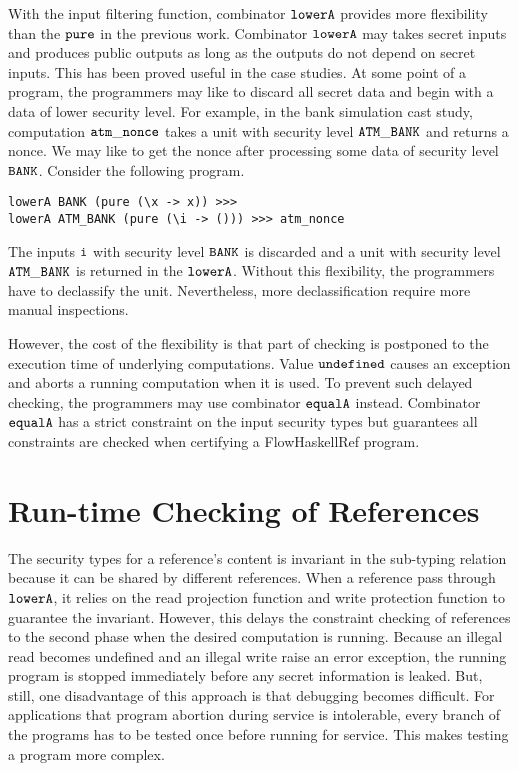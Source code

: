 \documentclass{report}
\newcommand{\co}[1]{$\cod{#1}$}
\begin{document}
With the input filtering function, combinator \co{lowerA} provides more flexibility than
the \co{pure} in the previous work. Combinator \co{lowerA} may takes secret inputs and produces
public outputs as long as the outputs do not depend on secret inputs. This has been proved
useful in the case studies. At some point of a program, the programmers may like to discard all
secret data and begin with a data of lower security level. 
For example, in the bank simulation cast study, computation
\co{atm\_nonce} takes a unit with security level \co{ATM\_BANK} and returns a nonce. 
We may like to get the nonce after processing some data of security level \co{BANK}.
Consider the following program.
\begin{Verbatim}[fontsize=\small]
lowerA BANK (pure (\x -> x)) >>>
lowerA ATM_BANK (pure (\i -> ())) >>> atm_nonce
\end{Verbatim}
The inputs \co{i} with security level \co{BANK} is discarded and a unit with security level 
\co{ATM\_BANK} is returned in the \co{lowerA}. Without this flexibility, the programmers have to
declassify the unit. Nevertheless, more declassification require more manual inspections.

However, the cost of the flexibility is that part of checking is postponed to the execution time of
underlying computations. Value \co{undefined} causes an exception and aborts a running computation
when it is used. To prevent such delayed checking, the programmers may use combinator \co{equalA} instead.
Combinator \co{equalA} has a strict constraint on the input security types but guarantees all constraints
are checked when certifying a FlowHaskellRef program.

\section{Run-time Checking of References}
The security types for a reference's content is invariant in the sub-typing relation because 
it can be shared by different references.
When a reference pass through \co{lowerA}, it relies on the read projection function and
write protection function to guarantee the invariant.
However, this delays the constraint checking of references to the second phase when the
desired computation is running.
Because an illegal read becomes undefined and an illegal write raise an error exception,
the running program is stopped immediately before any secret information is leaked.
But, still, one disadvantage of this approach is that debugging becomes difficult. 
For applications that program abortion during service is intolerable, 
every branch of the programs has to be tested once before running for service. 
This makes testing a program more complex.
\end{document}
